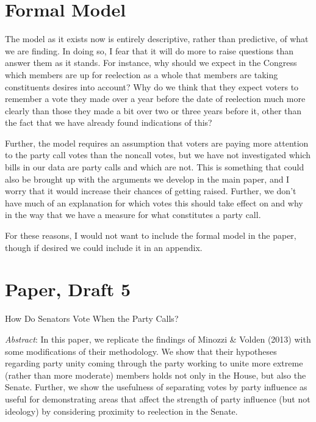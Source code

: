 \documentclass[12pt]{article}
\begin{document}
\section{Formal Model}

The model as it exists now is entirely descriptive, rather than predictive, of what we are finding. In doing so, I fear that it will do more to raise questions than answer them as it stands. For instance, why should we expect in the Congress which members are up for reelection as a whole that members are taking constituents desires into account? Why do we think that they expect voters to remember a vote they made over a year before the date of reelection much more clearly than those they made a bit over two or three years before it, other than the fact that we have already found indications of this? 

Further, the model requires an assumption that voters are paying more attention to the party call votes than the noncall votes, but we have not investigated which bills in our data are party calls and which are not. This is something that could also be brought up with the arguments we develop in the main paper, and I worry that it would increase their chances of getting raised. Further, we don't have much of an explanation for which votes this should take effect on and why in the way that we have a measure for what constitutes a party call.

For these reasons, I would not want to include the formal model in the paper, though if desired we could include it in an appendix.

\pagebreak

\doublespacing
	
\section{Paper, Draft 5}

\begin{center}
	\large How Do Senators Vote When the Party Calls?
\end{center}

\begin{minipage}{15cm}
	\singlespacing
	\small \textit{Abstract}: In this paper, we replicate the findings of Minozzi \& Volden (2013) with some modifications of their methodology. We show that their hypotheses regarding party unity coming through the party working to unite more extreme (rather than more moderate) members holds not only in the House, but also the Senate. Further, we show the usefulness of separating votes by party influence as useful for demonstrating areas that affect the strength of party influence (but not ideology) by considering proximity to reelection in the Senate.
\end{minipage}
\end{document}
